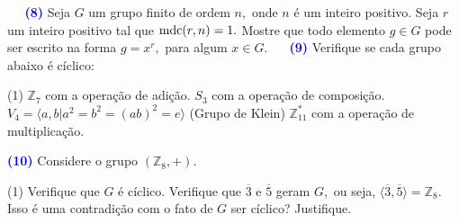 \documentclass[12pt, a4paper]{article}
\newcommand{\mdc}{{\rm mdc}}
\newcommand{\negrito}[1]{\mbox{\boldmath{$#1$}}}
\begin{document}
\textcolor{white}{Oi}\newline\newline
\textcolor{blue}{\bf(8)}\label{8} Seja $G$ um grupo finito de ordem $n,$ onde $n$ é um inteiro positivo. Seja $r$ um inteiro positivo tal que $\mdc(r,n)=1.$ Mostre que todo elemento $g \in G$ pode ser escrito na forma $g = x^r,$ para algum $x \in G.$%
\textcolor{white}{Oi}\newline\newline
\textcolor{blue}{\bf(9)}\label{ex1} Verifique se cada grupo abaixo é cíclico:%
\begin{tasks}[counter-format={(tsk[a])},label-width=3.6ex, label-format = {\bfseries}, column-sep = {0pt}](1)
\task[\textcolor{Floresta}{$\negrito{(a)} $}] $\mathbb{Z}_7$ com a operação de adição.
\task[\textcolor{Floresta}{$\negrito{(b)} $}] $S_3$ com a operação de composição.
\task[\textcolor{Floresta}{$\negrito{(c)} $}] $V_4 = \langle a,b | a^2 = b^2 = (ab)^2 = e \rangle$ (Grupo de Klein)
\task[\textcolor{Floresta}{$\negrito{(d)} $}] $\mathbb{Z}^{*}_{11}$ com a operação de multiplicação.
\end{tasks}
\textcolor{blue}{\bf(10)}\label{ex2} Considere o grupo $(\mathbb{Z}_8, +).$
\begin{tasks}[counter-format={(tsk[a])},label-width=3.6ex, label-format = {\bfseries}, column-sep = {0pt}](1)
\task[\textcolor{Floresta}{$\negrito{(a)} $}] Verifique que $G$ é cíclico.
\task[\textcolor{Floresta}{$\negrito{(b)} $}] Verifique que $\overline{3}$ e $\overline{5}$ geram $G,$ ou seja, $\langle \overline{3}, \overline{5} \rangle = \mathbb{Z}_8.$ Isso é uma contradição com o fato de $G$ ser cíclico? Justifique.
\end{tasks}
\newpage
\end{document}
